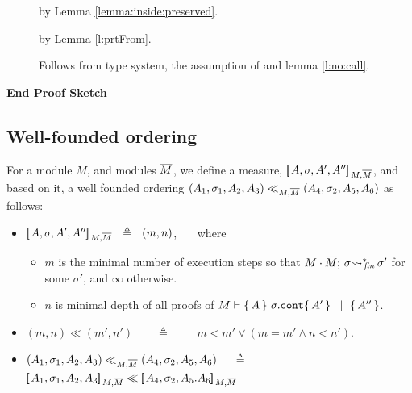 {{\begin{description}
\item[{}] by Lemma \ref{lemma:inside:preserved}.

\item[{}] by Lemma \ref{l:prtFrom}.

\item[{}] 

Follows from type system, the assumption of {} and lemma \ref{l:no:call}.


\end{description}
\noindent
\vspace{.1cm}
{\textbf{End Proof Sketch}} 



\subsection{Well-founded ordering}

 \begin{definition}
\label{def:measure}
For a module $M$, and modules $\overline{M}$,   we define a measure, $[\!\![\, A, \sigma,A',A'' ]\!\!]\,_{M,\overline{M}} $, and based on it, a well founded ordering $(A_1,\sigma_1,A_2, A_3) \ll_{M,\overline{M}}  (A_4,\sigma_2,A_5,A_6)$
as follows:
\begin{itemize}
\item
 $[\!\![\, A, \sigma,A',A'' ]\!\!]\,_{M,\overline{M}} \  \ \triangleq \ \  (m, n)$,  \ \ \  where
\begin{itemize}
\item
$m$ is the minimal number of execution steps so that $ M\cdot \overline{M};\, {\sigma} {\rightsquigarrow^*}\!\!_{\mathit{fin}}\, \sigma'$  for some $\sigma'$, {and $\infty$ otherwise}.
 \item
  $n$ is minimal depth of all proofs of $M \vdash  \{\, A \, \}\ \sigma.\mbox{\normalfont{\texttt{cont}}} \{\, A' \, \} \, \,\parallel\,\, \{\, A'' \, \}  $.
\end{itemize}
 \item
 $(m,n) \ll (m',n')$\ \  \ \ $\triangleq$ \ \  \ \ $ m<m'\vee  (m=m'  \wedge n < n')   $.
\item
$(A_1,\sigma_1,A_2, A_3) \ll_{M,\overline{M}}  (A_4,\sigma_2,A_5, A_6)$  \  \  $\triangleq$ \ \ 
$\measure {A_1, \sigma_1,A_2, A_3} {M,\Mtwo}  \ll \measure {A_4, \sigma_2,A_5. A_6} {M,\Mtwo} $
\end{itemize}
\end{definition}


}}
